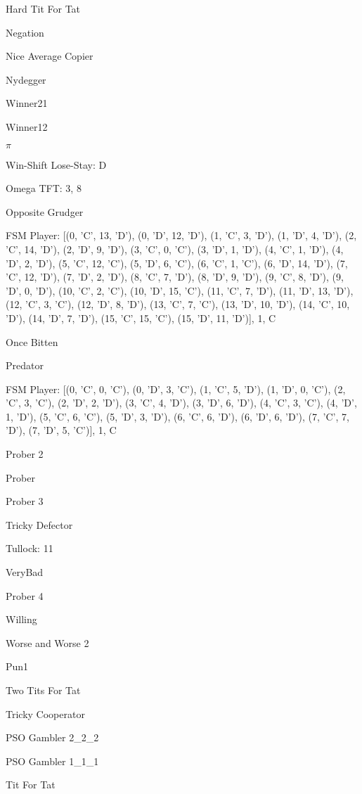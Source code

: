 \item Hard Tit For Tat
\item Negation
\item Nice Average Copier
\item Nydegger
\item Winner21
\item Winner12
\item $\pi$
\item Win-Shift Lose-Stay: D
\item Omega TFT: 3, 8
\item Opposite Grudger
\item FSM Player: [(0, 'C', 13, 'D'), (0, 'D', 12, 'D'), (1, 'C', 3, 'D'), (1, 'D', 4, 'D'), (2, 'C', 14, 'D'), (2, 'D', 9, 'D'), (3, 'C', 0, 'C'), (3, 'D', 1, 'D'), (4, 'C', 1, 'D'), (4, 'D', 2, 'D'), (5, 'C', 12, 'C'), (5, 'D', 6, 'C'), (6, 'C', 1, 'C'), (6, 'D', 14, 'D'), (7, 'C', 12, 'D'), (7, 'D', 2, 'D'), (8, 'C', 7, 'D'), (8, 'D', 9, 'D'), (9, 'C', 8, 'D'), (9, 'D', 0, 'D'), (10, 'C', 2, 'C'), (10, 'D', 15, 'C'), (11, 'C', 7, 'D'), (11, 'D', 13, 'D'), (12, 'C', 3, 'C'), (12, 'D', 8, 'D'), (13, 'C', 7, 'C'), (13, 'D', 10, 'D'), (14, 'C', 10, 'D'), (14, 'D', 7, 'D'), (15, 'C', 15, 'C'), (15, 'D', 11, 'D')], 1, C
\item Once Bitten
\item Predator
\item FSM Player: [(0, 'C', 0, 'C'), (0, 'D', 3, 'C'), (1, 'C', 5, 'D'), (1, 'D', 0, 'C'), (2, 'C', 3, 'C'), (2, 'D', 2, 'D'), (3, 'C', 4, 'D'), (3, 'D', 6, 'D'), (4, 'C', 3, 'C'), (4, 'D', 1, 'D'), (5, 'C', 6, 'C'), (5, 'D', 3, 'D'), (6, 'C', 6, 'D'), (6, 'D', 6, 'D'), (7, 'C', 7, 'D'), (7, 'D', 5, 'C')], 1, C
\item Prober 2
\item Prober
\item Prober 3
\item Tricky Defector
\item Tullock: 11
\item VeryBad
\item Prober 4
\item Willing
\item Worse and Worse 2
\item Pun1
\item Two Tits For Tat
\item Tricky Cooperator
\item PSO Gambler 2\_2\_2
\item PSO Gambler 1\_1\_1
\item Tit For Tat
